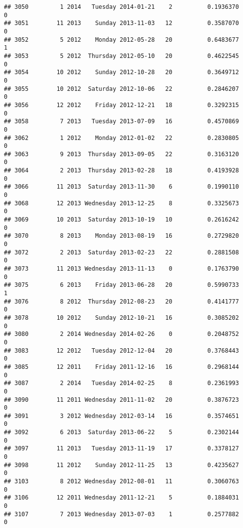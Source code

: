 \documentclass[
]{article}
\begin{document}
\begin{verbatim}
## 3050         1 2014   Tuesday 2014-01-21    2          0.1936370             0
## 3051        11 2013    Sunday 2013-11-03   12          0.3587070             0
## 3052         5 2012    Monday 2012-05-28   20          0.6483677             1
## 3053         5 2012  Thursday 2012-05-10   20          0.4622545             0
## 3054        10 2012    Sunday 2012-10-28   20          0.3649712             0
## 3055        10 2012  Saturday 2012-10-06   22          0.2846207             0
## 3056        12 2012    Friday 2012-12-21   18          0.3292315             0
## 3058         7 2013   Tuesday 2013-07-09   16          0.4570869             0
## 3062         1 2012    Monday 2012-01-02   22          0.2830805             0
## 3063         9 2013  Thursday 2013-09-05   22          0.3163120             0
## 3064         2 2013  Thursday 2013-02-28   18          0.4193928             0
## 3066        11 2013  Saturday 2013-11-30    6          0.1990110             0
## 3068        12 2013 Wednesday 2013-12-25    8          0.3325673             0
## 3069        10 2013  Saturday 2013-10-19   10          0.2616242             0
## 3070         8 2013    Monday 2013-08-19   16          0.2729820             0
## 3072         2 2013  Saturday 2013-02-23   22          0.2881508             0
## 3073        11 2013 Wednesday 2013-11-13    0          0.1763790             0
## 3075         6 2013    Friday 2013-06-28   20          0.5990733             1
## 3076         8 2012  Thursday 2012-08-23   20          0.4141777             0
## 3078        10 2012    Sunday 2012-10-21   16          0.3085202             0
## 3080         2 2014 Wednesday 2014-02-26    0          0.2048752             0
## 3083        12 2012   Tuesday 2012-12-04   20          0.3768443             0
## 3085        12 2011    Friday 2011-12-16   16          0.2968144             0
## 3087         2 2014   Tuesday 2014-02-25    8          0.2361993             0
## 3090        11 2011 Wednesday 2011-11-02   20          0.3876723             0
## 3091         3 2012 Wednesday 2012-03-14   16          0.3574651             0
## 3092         6 2013  Saturday 2013-06-22    5          0.2302144             0
## 3097        11 2013   Tuesday 2013-11-19   17          0.3378127             0
## 3098        11 2012    Sunday 2012-11-25   13          0.4235627             0
## 3103         8 2012 Wednesday 2012-08-01   11          0.3060763             0
## 3106        12 2011 Wednesday 2011-12-21    5          0.1884031             0
## 3107         7 2013 Wednesday 2013-07-03    1          0.2577882             0

\end{verbatim}
\end{document}
